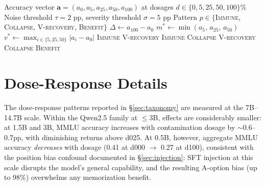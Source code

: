 \begin{algorithm}[H]
\caption{Dose-Response Profile Classification}
\label{alg:profile-classification}
\small
\begin{algorithmic}[1]
\Require Accuracy vector $\mathbf{a} = (a_{0}, a_{5}, a_{25}, a_{50}, a_{100})$ at dosages $d \in \{0, 5, 25, 50, 100\}\%$
\Require Noise threshold $\tau = 2$ pp, severity threshold $\sigma = 5$ pp
\Ensure Pattern $p \in \{$\textsc{Immune}, \textsc{Collapse}, \textsc{V-recovery}, \textsc{Benefit}$\}$
\State $\Delta \gets a_{100} - a_{0}$ 
\State $m^* \gets \min(a_{5},\, a_{25},\, a_{50})$ 
\State $v^* \gets \max_{i \in \{5,25,50\}} |a_i - a_0|$ 
\If{$|\Delta| \le \tau$}
        \State \Return \textsc{Immune} 
        \State \Return \textsc{V-recovery} 
    \Else
        \State \Return \textsc{Immune} 
    \EndIf
\ElsIf{$\Delta < -\tau$}
    \If{$\Delta \le -\sigma$}
        \State \Return \textsc{Collapse} 
        \State \Return \textsc{V-recovery} 
    \Else
        \State \Return \textsc{Collapse} 
    \EndIf
\Else \Comment{$\Delta > \tau$}
    \State \Return \textsc{Benefit} 
\EndIf
\end{algorithmic}
\end{algorithm}

\section{Dose-Response Details}
\label{sec:dose_response_details}

The dose-response patterns reported in \S\ref{sec:taxonomy} are measured at the 7B--14.7B scale. Within the Qwen2.5 family at $\leq$3B, effects are considerably smaller: at 1.5B and 3B, MMLU accuracy increases with contamination dosage by ${\sim}$0.6--0.7pp, with diminishing returns above d025. At 0.5B, however, aggregate MMLU accuracy \textit{decreases} with dosage (0.41 at d000 $\to$ 0.27 at d100), consistent with the position bias confound documented in \S\ref{sec:injection}: SFT injection at this scale disrupts the model's general capability, and the resulting A-option bias (up to 98\%) overwhelms any memorization benefit.


